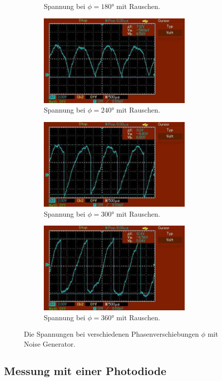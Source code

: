 \begin{figure}[H]
\begin{subfigure}{0.42\textwidth}
      \caption{Spannung bei $\phi = 180°$ mit Rauschen.}
  \end{subfigure}
\hfill 
  \begin{subfigure}{0.42\textwidth}
      \centering
      \includegraphics[height=4.5cm]{content/abbildungen/mit/240.pdf}
      \caption{Spannung bei $\phi = 240°$ mit Rauschen.}
  \end{subfigure}
\hfill 
  \begin{subfigure}{0.42\textwidth}
      \centering
      \includegraphics[height=4.5cm]{content/abbildungen/mit/300.pdf}
      \caption{Spannung bei $\phi = 300°$ mit Rauschen.}
  \end{subfigure}
\hfill 
  \begin{subfigure}{0.42\textwidth}
      \centering
      \includegraphics[height=4.5cm]{content/abbildungen/mit/360.pdf}
      \caption{Spannung bei $\phi = 360°$ mit Rauschen.}
  \end{subfigure}
\caption{Die Spannungen bei verschiedenen Phasenverschiebungen $\phi$ mit Noise Generator.}
\label{fig:mit}
\end{figure}

\subsection{Messung mit einer Photodiode}
\label{subsec:Photodiode}


